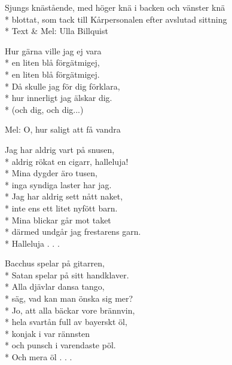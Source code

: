 \pagestyle{Bordsvisor}
\begin{SongText}
    \begin{SongInfo}
        Sjungs knästående, med höger knä i backen och vänster knä\\*%
        blottat, som tack till Kårpersonalen efter avslutad sittning\\*%
        Text \& Mel: Ulla Billquist
    \end{SongInfo}
    \begin{SongVerse}
        Hur gärna ville jag ej vara\\*%
        en liten blå förgätmigej,\\*%
        en liten blå förgätmigej.\\*%
        Då skulle jag för dig förklara,\\*%
        hur innerligt jag älskar dig.\\*%
        (och dig, och dig...)
    \end{SongVerse}
\end{SongText}
\begin{SongText}
    \begin{SongInfo}
        Mel: O, hur saligt att få vandra
    \end{SongInfo}
    \begin{SongVerse}
        Jag har aldrig vart på snusen,\\*%
        aldrig rökat en cigarr, halleluja!\\*%
        Mina dygder äro tusen,\\*%
        inga syndiga laster har jag.\\*%
        Jag har aldrig sett nått naket,\\*%
        inte ens ett litet nyfött barn.\\*%
        Mina blickar går mot taket\\*%
        därmed undgår jag frestarens garn.\\*%
        Halleluja . . .
    \end{SongVerse}
    \begin{SongVerse}
        Bacchus spelar på gitarren,\\*%
        Satan spelar på sitt handklaver.\\*%
        Alla djävlar dansa tango,\\*%
        säg, vad kan man önska sig mer?\\*%
        Jo, att alla bäckar vore brännvin,\\*%
        hela svartån full av bayerskt öl,\\*%
        konjak i var rännsten\\*%
        och punsch i varendaste pöl.\\*%
        Och mera öl . . .
    \end{SongVerse}
\end{SongText}
